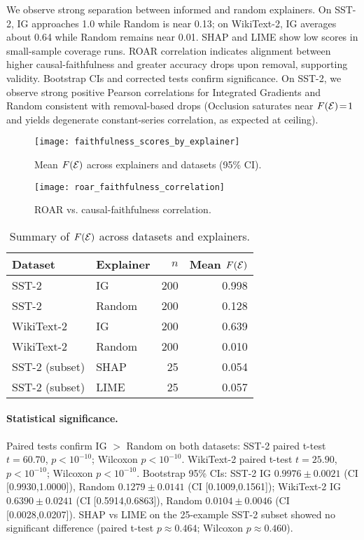 We observe strong separation between informed and random explainers. On SST-2, IG approaches 1.0 while Random is near 0.13; on WikiText-2, IG averages about 0.64 while Random remains near 0.01. SHAP and LIME show low scores in small-sample coverage runs. ROAR correlation indicates alignment between higher causal-faithfulness and greater accuracy drops upon removal, supporting validity. Bootstrap CIs and corrected tests confirm significance. On SST-2, we observe strong positive Pearson correlations for Integrated Gradients and Random consistent with removal-based drops (Occlusion saturates near $F(\mathcal{E})\!=\!1$ and yields degenerate constant-series correlation, as expected at ceiling).

\begin{figure}[t]
    \centering
    \texttt{[image: faithfulness\_scores\_by\_explainer]}
    \caption{Mean $F(\mathcal{E})$ across explainers and datasets (95\% CI).}
\end{figure}

\begin{figure}[t]
    \centering
    \texttt{[image: roar\_faithfulness\_correlation]}
    \caption{ROAR vs. causal-faithfulness correlation.}
\end{figure}

\begin{table}[t]
\centering
\small
\begin{tabular}{l l r r}
\toprule
Dataset & Explainer & $n$ & Mean $F(\mathcal{E})$ \\
\midrule
SST-2 & IG & 200 & 0.998 \\
SST-2 & Random & 200 & 0.128 \\
WikiText-2 & IG & 200 & 0.639 \\
WikiText-2 & Random & 200 & 0.010 \\
SST-2 (subset) & SHAP & 25 & 0.054 \\
SST-2 (subset) & LIME & 25 & 0.057 \\
\bottomrule
\end{tabular}
\caption{Summary of $F(\mathcal{E})$ across datasets and explainers.}
\end{table}

\paragraph{Statistical significance.} Paired tests confirm IG $>$ Random on both datasets: SST-2 paired t-test $t\!=\!60.70$, $p{<}10^{-10}$; Wilcoxon $p{<}10^{-10}$. WikiText-2 paired t-test $t\!=\!25.90$, $p{<}10^{-10}$; Wilcoxon $p{<}10^{-10}$. Bootstrap 95\% CIs: SST-2 IG $0.9976\pm0.0021$ (CI [0.9930,1.0000]), Random $0.1279\pm0.0141$ (CI [0.1009,0.1561]); WikiText-2 IG $0.6390\pm0.0241$ (CI [0.5914,0.6863]), Random $0.0104\pm0.0046$ (CI [0.0028,0.0207]). SHAP vs LIME on the 25-example SST-2 subset showed no significant difference (paired t-test $p\approx0.464$; Wilcoxon $p\approx0.460$).

